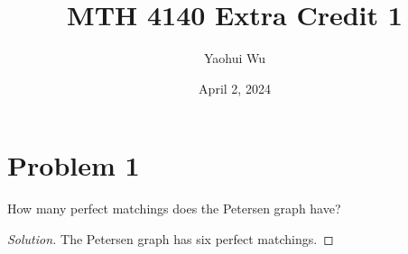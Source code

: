 \documentclass[12pt]{article}
\title{MTH 4140 Extra Credit 1}
\author{Yaohui Wu}
\date{April 2, 2024}
\newenvironment*{solution}{\begin{proof}[Solution]}{\end{proof}}
\begin{document}
\maketitle
\section*{Problem 1}
How many perfect matchings does the Petersen graph have?
\begin{solution}
    The Petersen graph has six perfect matchings.
\end{solution}
\end{document}
